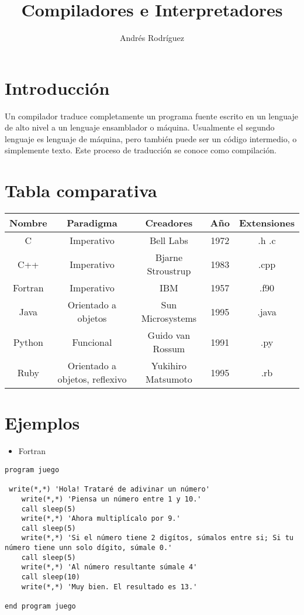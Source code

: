 \documentclass{article}
\title{Compiladores e Interpretadores}
\author{Andr\'es Rodr\'iguez}
\date{}
\begin{document}
\maketitle

\section{Introducci\'on}
Un compilador traduce completamente un programa fuente escrito en un lenguaje de alto nivel a un lenguaje ensamblador o m\'aquina. Usualmente el segundo lenguaje es lenguaje de m\'aquina, pero tambi\'en puede ser un c\'odigo intermedio, o simplemente texto. Este proceso de traducci\'on se conoce como compilaci\'on.

\section{Tabla comparativa}
\begin{tabular}{|c | c | c | c | c|}

\hline
Nombre & Paradigma & Creadores & A\~no & Extensiones\\ \hline \hline

C & Imperativo & Bell Labs & 1972 & .h .c \\ \hline

C++ & Imperativo & Bjarne Stroustrup  & 1983 & .cpp \\ \hline

Fortran & Imperativo & IBM & 1957 & .f90\\ \hline

Java & Orientado a objetos & Sun Microsystems & 1995 & .java\\ \hline

Python & Funcional & Guido van Rossum & 1991 & .py\\ \hline

Ruby & Orientado a objetos, reflexivo & Yukihiro Matsumoto & 1995 & .rb \\ \hline

\end{tabular}


\section{Ejemplos}

\begin{itemize}
\item Fortran
\end{itemize}
\begin{verbatim}
program juego
   
 write(*,*) 'Hola! Trataré de adivinar un número'
    write(*,*) 'Piensa un número entre 1 y 10.'
    call sleep(5)
    write(*,*) 'Ahora multiplícalo por 9.'
    call sleep(5)
    write(*,*) 'Si el número tiene 2 digítos, súmalos entre si; Si tu número tiene unn solo dígito, súmale 0.'
    call sleep(5)
    write(*,*) 'Al número resultante súmale 4'
    call sleep(10)
    write(*,*) 'Muy bien. El resultado es 13.' 

end program juego

\end{verbatim}
\end{document}
